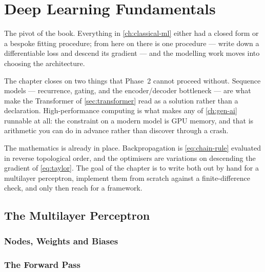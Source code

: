 %
\chapter{Deep Learning Fundamentals}
\label{ch:deep-learning}

The pivot of the book. Everything in \cref{ch:classical-ml} either had a closed
form or a bespoke fitting procedure; from here on there is one procedure ---
write down a differentiable loss and descend its gradient --- and the modelling
work moves into choosing the architecture.

The chapter closes on two things that Phase~2 cannot proceed without. Sequence
models --- recurrence, gating, and the encoder/decoder bottleneck --- are what
make the Transformer of \cref{sec:transformer} read as a solution rather than a
declaration. High-performance computing is what makes any of
\cref{ch:gen-ai} runnable at all: the constraint on a modern model is GPU
memory, and that is arithmetic you can do in advance rather than discover
through a crash.

The mathematics is already in place. Backpropagation is \cref{eq:chain-rule}
evaluated in reverse topological order, and the optimisers are variations on
descending the gradient of \cref{eq:taylor}. The goal of the chapter is to
write both out by hand for a multilayer perceptron, implement them from scratch
against a finite-difference check, and only then reach for a framework.

\section{The Multilayer Perceptron}
\label{sec:mlp}

\subsection{Nodes, Weights and Biases}

\subsection{The Forward Pass}

